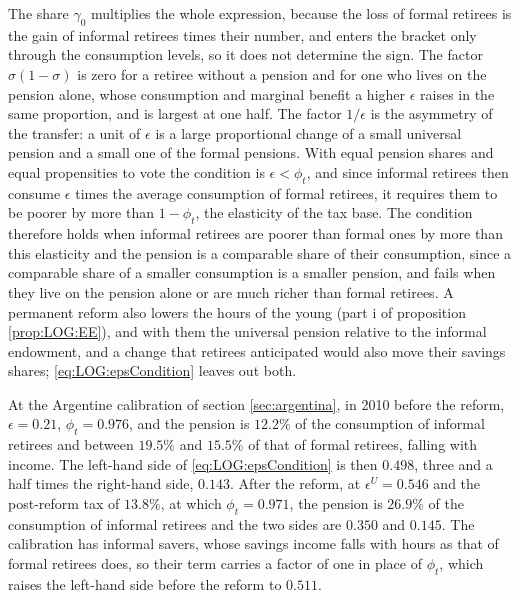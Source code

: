 The share $\gamma_0$ multiplies the whole expression, because the loss of formal retirees is the gain of informal retirees times their number, and enters the bracket only through the consumption levels, so it does not determine the sign. The factor $\sigma(1-\sigma)$ is zero for a retiree without a pension and for one who lives on the pension alone, whose consumption and marginal benefit a higher $\epsilon$ raises in the same proportion, and is largest at one half. The factor $1/\epsilon$ is the asymmetry of the transfer: a unit of $\epsilon$ is a large proportional change of a small universal pension and a small one of the formal pensions. With equal pension shares and equal propensities to vote the condition is $\epsilon < \phi_t$, and since informal retirees then consume $\epsilon$ times the average consumption of formal retirees, it requires them to be poorer by more than $1-\phi_t$, the elasticity of the tax base. The condition therefore holds when informal retirees are poorer than formal ones by more than this elasticity and the pension is a comparable share of their consumption, since a comparable share of a smaller consumption is a smaller pension, and fails when they live on the pension alone or are much richer than formal retirees. A permanent reform also lowers the hours of the young (part i of proposition \ref{prop:LOG:EE}), and with them the universal pension relative to the informal endowment, and a change that retirees anticipated would also move their savings shares; \eqref{eq:LOG:epsCondition} leaves out both.

At the Argentine calibration of section \ref{sec:argentina}, in 2010 before the reform, $\epsilon = 0.21$, $\phi_t = 0.976$, and the pension is $12.2\%$ of the consumption of informal retirees and between $19.5\%$ and $15.5\%$ of that of formal retirees, falling with income. The left-hand side of \eqref{eq:LOG:epsCondition} is then $0.498$, three and a half times the right-hand side, $0.143$. After the reform, at $\epsilon^U = 0.546$ and the post-reform tax of $13.8\%$, at which $\phi_t = 0.971$, the pension is $26.9\%$ of the consumption of informal retirees and the two sides are $0.350$ and $0.145$. The calibration has informal savers, whose savings income falls with hours as that of formal retirees does, so their term carries a factor of one in place of $\phi_t$, which raises the left-hand side before the reform to $0.511$.

